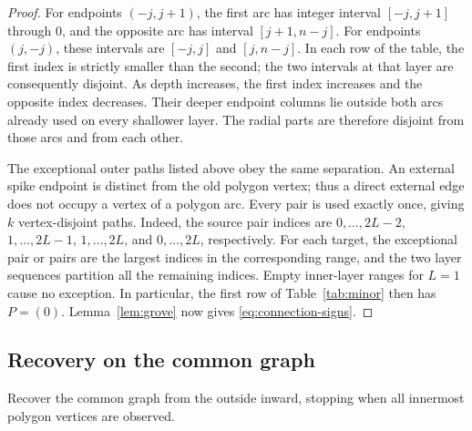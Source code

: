 \documentclass[11pt]{article}
\theoremstyle{definition}
\begin{document}
\begin{proof}
For endpoints \((-j,j+1)\), the first arc has integer interval
\([-j,j+1]\) through 0, and the opposite arc has interval
\([j+1,n-j]\). For endpoints \((j,-j)\), these intervals are
\([-j,j]\) and \([j,n-j]\).
In each row of the table, the first index is strictly smaller than
the second; the two intervals at that layer are consequently disjoint.
As depth increases, the first index increases and the opposite index
decreases. Their deeper endpoint columns lie outside both arcs already
used on every shallower layer. The radial parts are therefore disjoint
from those arcs and from each other.

The exceptional outer paths listed above obey the same separation.
An external spike endpoint is distinct from the old polygon vertex;
thus a direct external edge does not occupy a vertex of a polygon
arc. Every pair is used exactly once, giving \(k\) vertex-disjoint
paths. Indeed, the source pair indices are \(0,\ldots,2L-2\),
\(1,\ldots,2L-1\), \(1,\ldots,2L\), and \(0,\ldots,2L\),
respectively. For each target, the exceptional pair or pairs are
the largest indices in the corresponding range, and the two
layer sequences partition all the remaining indices.
Empty inner-layer ranges for \(L=1\) cause no exception.
In particular, the first row of Table~\ref{tab:minor} then has \(P=(0)\).
Lemma~\ref{lem:grove} now gives \eqref{eq:connection-signs}.
\end{proof}

\subsection{Recovery on the common graph}
\label{sec:recovery}

Recover the common graph from the outside inward, stopping when all
innermost polygon vertices are observed.
\end{document}
